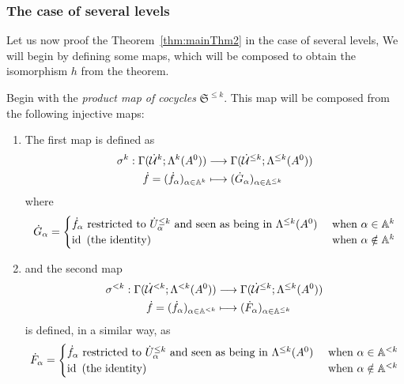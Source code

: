 \subsubsection{The case of several levels}
Let us now proof the Theorem~\ref{thm:mainThm2} in the case of several levels,
We will begin by defining some maps, which will be composed to obtain the
isomorphism $h$ from the theorem.
\begin{defn}\label{defn:firstSetOfInlusions}
  Begin with the \emph{product map of cocycles} $\mathfrak{S}^{\leq k}$.
  This map will be composed from the following injective maps:
  \begin{enumerate}
    \item The first map is defined as
      \begin{align*}
        \sigma^k:\Gamma(\dot{\mathcal{U}}^k;\Lambda^k(A^0))
        &\longrightarrow \Gamma(\dot{\mathcal{U}}^{\leq k};\Lambda^{\leq k}(A^0))
      \\\dot f=(\dot f_\alpha)_{\alpha\in\mathbb{A}^k}
        &\longmapsto (\dot G_\alpha)_{\alpha\in\mathbb{A}^{\leq k}}
      \end{align*}
      where
      \[
        \dot G_\alpha=\begin{cases}
          \dot f_\alpha \text{~restricted to } \dot U_\alpha^{\leq k}
          \text{~and seen as being in } \Lambda^{\leq k}(A^0)
          & \text{~when } \alpha\in\mathbb{A}^k
        \\\operatorname{id} \text{~(the identity) }
          & \text{~when } \alpha\notin\mathbb{A}^k
        \end{cases}
      \]
    \item and the second map
      \begin{align*}
        \sigma^{<k}:\Gamma(\dot{\mathcal{U}}^{<k};\Lambda^{<k}(A^0))
        &\longrightarrow \Gamma(\dot{\mathcal{U}}^{\leq k};\Lambda^{\leq k}(A^0))
      \\\dot f=(\dot f_\alpha)_{\alpha\in\mathbb{A}^{<k}}
        &\longmapsto (\dot F_\alpha)_{\alpha\in\mathbb{A}^{\leq k}}
      \end{align*}
      is defined, in a similar way, as
      \[
        \dot F_\alpha=\begin{cases}
          \dot f_\alpha \text{~restricted to } \dot U_\alpha^{\leq k}
          \text{~and seen as being in } \Lambda^{\leq k}(A^0)
          & \text{~when } \alpha\in\mathbb{A}^{<k}
        \\\operatorname{id} \text{~(the identity) }
          & \text{~when } \alpha\notin\mathbb{A}^{<k}
        \end{cases}
\]
\end{enumerate}
\end{defn}
